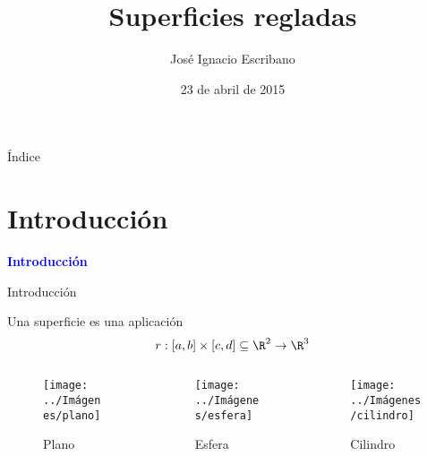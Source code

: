 \documentclass[10pt]{beamer}
\author{José Ignacio Escribano}
\title{Superficies regladas}
\date{23 de abril de 2015}
\institute[URJC]{\texttt{[image: logoURJC.jpg]}}
\begin{document}
	\begin{frame}[plain]
		\maketitle
	\end{frame}
	
	\begin{frame}{Índice}
		\tableofcontents
	\end{frame}
	
	
	\section{Introducción}
	
	\begin{frame}
		\begin{center}
			\Huge\textbf{\textsf{\textcolor{blue}{Introducción}}}
		\end{center}
	\end{frame}
	
	
	\begin{frame}{Introducción}
		\begin{defi}
			Una superficie es una aplicación
			\begin{equation}
			r : [a,b] \times [c,d] \subseteq \R^2 \to \R^3
			\end{equation}
		\end{defi}
		

		\begin{columns}[b] %
			\begin{column}{.33\textwidth}
				\begin{figure}
					\centering
					\texttt{[image: ../Imágenes/plano]}
					\caption{Plano}
					\label{fig:plano}
				\end{figure}
			\end{column}%
			\hfill%
			\begin{column}{.33\textwidth}
				\begin{figure}
					\centering
					\texttt{[image: ../Imágenes/esfera]}
					\caption{Esfera}
					\label{fig:esfera}
				\end{figure}
			\end{column}%
			\hfill%
			\begin{column}{.33\textwidth}
				\begin{figure}
					\centering
					\texttt{[image: ../Imágenes/cilindro]}
					\caption{Cilindro}
					\label{fig:cilindro}
				\end{figure}
			\end{column}%
		\end{columns}

	\end{frame}
	
\end{document}
